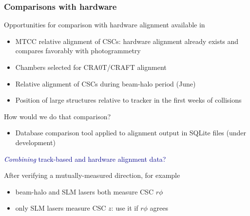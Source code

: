\documentclass[compress]{beamer}
\begin{document}
\begin{frame}
\frametitle{Comparisons with hardware}

Opportunities for comparison with hardware alignment available in
\begin{itemize}
\item MTCC relative alignment of CSCs: hardware alignment already
exists and compares favorably with photogrammetry

\item Chambers selected for CRA0T/CRAFT alignment

\item Relative alignment of CSCs during beam-halo period (June)

\item Position of large structures relative to tracker in the first weeks of collisions
\end{itemize}

How would we do that comparison?
\begin{itemize}
\item Database comparison tool applied to alignment output in SQLite files (under development)
\end{itemize}

\vfill
\hspace{-0.83 cm} \textcolor{darkblue}{\Large {\it Combining} track-based and hardware alignment data?}

After verifying a mutually-measured direction, for example
\begin{itemize}
\item beam-halo and SLM lasers both measure CSC $r\phi$
\item only SLM lasers measure CSC $z$: use it if $r\phi$ agrees
\end{itemize}
\end{frame}
\end{document}
